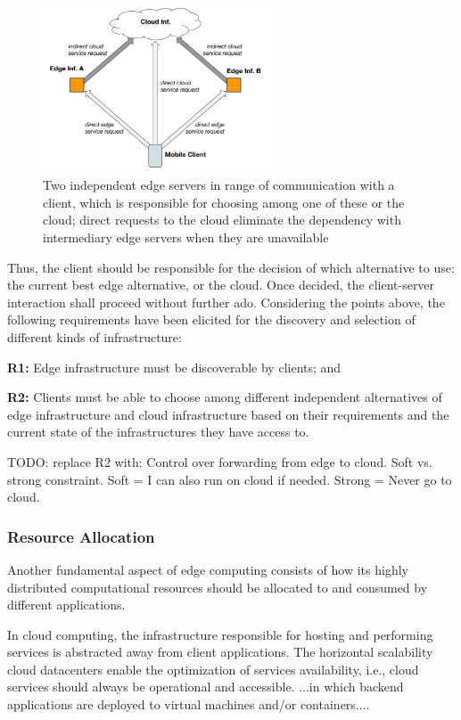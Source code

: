 \begin{figure}
  \includegraphics[width=0.6\textwidth]{figs/domain-selection.png}
  \caption{Two independent edge servers in range of communication with a client, which is responsible for choosing among one of these or the cloud; direct requests to the cloud eliminate the dependency with intermediary edge servers when they are unavailable}
  \label{fig:domain-selection}
\end{figure}


Thus, the client should be responsible for the decision of which alternative to use: the current best edge alternative, or the cloud. Once decided, the client-server interaction shall proceed without further ado.
Considering the points above, the following requirements have been elicited for the discovery and selection of different kinds of infrastructure:

\textbf{R1:} Edge infrastructure must be discoverable by clients; and 

\textbf{R2:} Clients must be able to choose among different independent alternatives of edge infrastructure and cloud infrastructure based on their requirements and the current state of the infrastructures they have access to.

TODO: replace R2 with: Control over forwarding from edge to cloud. Soft vs. strong constraint. Soft = I can also run on cloud if needed. Strong = Never go to cloud.

\subsubsection{Resource Allocation}

Another fundamental aspect of edge computing consists of how its highly distributed computational resources should be allocated to and consumed by different applications.

In cloud computing, the infrastructure responsible for hosting and performing services is abstracted away from client applications. The horizontal scalability cloud datacenters enable the optimization of services availability, i.e., cloud services should always be operational and accessible. ...in which backend applications are deployed to virtual machines and/or containers....

